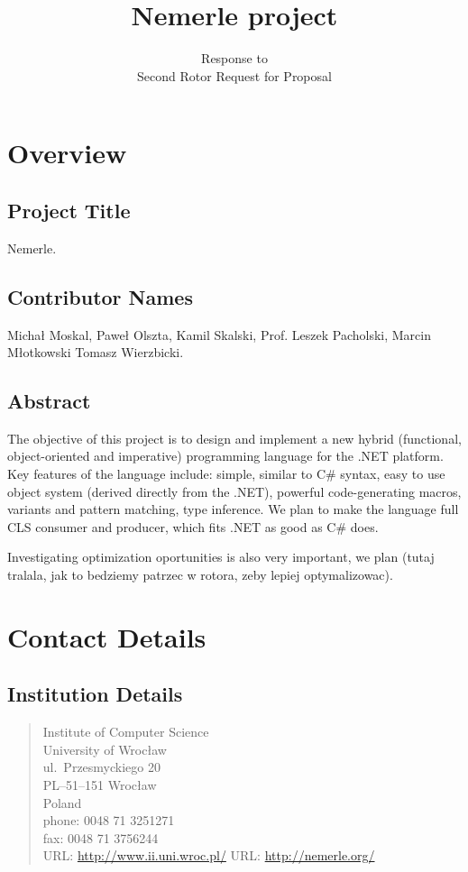 \documentclass[a4paper,11pt]{article}
\title{Nemerle project}
\author{Response to\\Second Rotor Request for Proposal}
\date{}
\begin{document}
\maketitle
\thispagestyle{empty}

\section{Overview}

\subsection{Project Title}

Nemerle.

\subsection{Contributor Names}
Micha{\l} Moskal, Pawe{\l} Olszta, Kamil Skalski, Prof. Leszek Pacholski, Marcin M{\l}otkowski
Tomasz Wierzbicki.

\subsection{Abstract}

The objective of this project is to design and implement a new hybrid
(functional, object-oriented and imperative) programming language for the
.NET platform. Key features of the language include: simple, similar to
C\# syntax, easy to use object system (derived directly from the .NET),
powerful code-generating macros, variants and pattern matching, type
inference. We plan to make the language full CLS consumer and producer,
which fits .NET as good as C\# does.

Investigating optimization oportunities is also very important, we
plan (tutaj tralala, jak to bedziemy patrzec w rotora, zeby lepiej
optymalizowac).

\section{Contact Details}


\subsection{Institution Details}

\begin{quote}
Institute of Computer Science\\
University of Wroc\l aw\\
ul.\ Przesmyckiego 20\\
PL--51--151 Wroc\l aw\\
Poland\\[2ex]
phone: 0048 71 3251271\\
fax:   0048 71 3756244\\
URL: \url{http://www.ii.uni.wroc.pl/}
URL: \url{http://nemerle.org/}
\end{quote}
\end{document}
